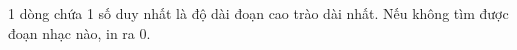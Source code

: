1 dòng chứa 1 số duy nhất là độ dài đoạn cao trào dài nhất. Nếu không tìm được đoạn nhạc nào, in ra 0.